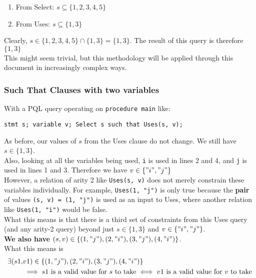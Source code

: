 \documentclass{article}
\begin{document}
\begin{enumerate}
    \item From Select: $s \subseteq \{1, 2, 3, 4, 5\}$
    \item From Uses: $s \subseteq \{1, 3\}$
\end{enumerate}

Clearly, $s \in  \{1, 2, 3, 4, 5\} \cap \{1, 3\} = \{1, 3\}$. The result of this query is therefore $\{1, 3\}$ \\

This might seem trivial, but this methodology will be applied through this document in increasingly complex ways. 

\subsubsection{Such That Clauses with two variables}
With a PQL query operating on \texttt{procedure main} like:
\begin{center}
\texttt{stmt s; variable v; Select s such that Uses(s, v);}
\end{center}

As before, our values of $s$ from the Uses clause do not change. We still have $s \in \{1, 3\}$. \\

Also, looking at all the variables being used, \texttt{i} is used in lines 2 and 4, and \texttt{j} is used in lines 1 and 3. Therefore we have $v \in \{"i", "j"\}$\\

However, a relation of arity 2 like \texttt{Uses(s, v)} does not merely constrain these variables individually. For example, \texttt{Uses(1, "j")} is only true because the \textbf{pair} of values \texttt{(s, v) = (1, "j")} is used as an input to Uses, where another relation like \texttt{Uses(1, "i")} would be false. \\

What this means is that there is a third set of constraints from this Uses query (and any arity-2 query) beyond just 
$s \in \{1, 3\}$ and $v \in \{"i", "j"\}$. \\

\textbf{We also have} $(s, v) \in \{(1, "j"), (2, "i"), (3, "j"), (4, "i")\}$.  \\

What this means is 
\begin{equation}
\begin{split}
     \exists (s1, & v1)  \in \{(1, "j"), (2, "i"), (3, "j"), (4, "i")\} \\
    & \implies s1 \text{ is a valid value for $s$ to take} \iff v1 \text{ is a valid value for $v$ to take}
    \end{split}
\end{equation}
\end{document}
